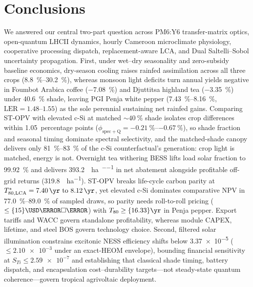 \documentclass[preprint,12pt,a4paper]{elsarticle}
\begin{document}
\section{Conclusions}
\label{sec:conclusions}

We answered our central two-part question across PM6:Y6 transfer-matrix optics, open-quantum LHCII dynamics, hourly Cameroon microclimate physiology, cooperative processing dispatch, replacement-aware LCA, and Dual Saltelli--Sobol uncertainty propagation. First, under wet--dry seasonality and zero-subsidy baseline economics, dry-season cooling raises rainfed assimilation across all three crops (\qtyrange{+8.8}{+30.2}{\percent}), whereas monsoon light deficits turn annual yields negative in Foumbot Arabica coffee (\qty{-7.08}{\percent}) and Djuttitsa highland tea (\qty{-3.35}{\percent}) under \qty{40.6}{\percent} shade, leaving PGI Penja white pepper (\qtyrange{+7.43}{+8.16}{\percent}, $\mathrm{LER} = \numrange{1.48}{1.55}$) as the sole perennial sustaining net rainfed gains. Comparing ST-OPV with elevated c-Si at matched $\sim\qty{40}{\percent}$ shade isolates crop differences within \num{1.05}~percentage points ($\phi_{\mathrm{spec+Q}} = \qtyrange{-0.21}{-0.67}{\percent}$), so shade fraction and seasonal timing dominate spectral selectivity, and the matched-shade canopy delivers only \qtyrange{81}{83}{\percent} of the c-Si counterfactual's generation: crop light is matched, energy is not. Overnight tea withering BESS lifts load solar fraction to \qty{99.92}{\percent} and delivers \qty{393.2}{\tCOtwoe\per\hectare\per\yr} in net abatement alongside profitable off-grid returns (\qty{+319.8}{\kUSD\per\hectare}). ST-OPV breaks life-cycle carbon parity at $T_{80,\mathrm{LCA}}^* = \qtyrange{7.40}{8.12}{\yr}$, yet elevated c-Si dominates comparative NPV in \qtyrange{77.0}{89.0}{\percent} of sampled draws, so parity needs roll-to-roll pricing ($\le \qty{15}{\USD\per\square\meter}$) with $T_{80}\ge \qty{16.33}{\yr}$ in Penja pepper. Export tariffs and WACC govern standalone profitability, whereas module CAPEX, lifetime, and steel BOS govern technology choice. Second, filtered solar illumination constrains excitonic NESS efficiency shifts below \num{3.37e-5} ($\le \num{2.10e-3}$ under an exact-HEOM envelope), bounding financial sensitivity at $S_{Ti} \le \num{2.59e-7}$ and establishing that classical shade timing, battery dispatch, and encapsulation cost--durability targets---not steady-state quantum coherence---govern tropical agrivoltaic deployment.
\end{document}
